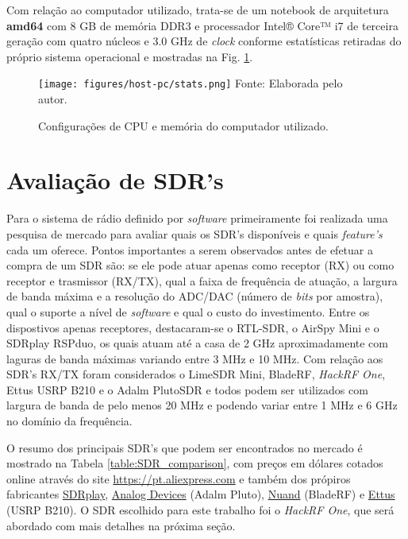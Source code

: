 \documentclass[
  12pt,				%
  openright,			%
  twoside,			%
  a4paper,			%
  english,			%
  french,				%
  spanish,			%
  brazil,				%
  ]{abntex2}
\begin{document}
Com relação ao computador utilizado, trata-se de um notebook de arquitetura \textbf{amd64} com 8 GB de memória DDR3 e processador Intel® Core™ i7 de terceira geração com quatro núcleos e
3.0 GHz de \textit{clock} conforme estatísticas retiradas do próprio sistema operacional e mostradas na Fig. \ref{fig:host_pc_stats}.

\begin{figure}[!htb]
  \centering
  \caption{Configurações de CPU e memória do computador utilizado.}
  \texttt{[image: figures/host-pc/stats.png]}
  Fonte: Elaborada pelo autor.
  \label{fig:host_pc_stats}
\end{figure}

\section*{Avaliação de SDR's}

Para o sistema de rádio definido por \textit{software} primeiramente foi realizada uma pesquisa de mercado para avaliar quais os SDR's disponíveis e quais
\textit{feature's} cada um oferece. Pontos importantes a serem observados antes de efetuar a compra de um SDR são: se ele pode atuar apenas como receptor
(RX) ou como receptor e trasmissor (RX/TX), qual a faixa de frequência de atuação, a largura de banda máxima e a resolução do ADC/DAC (número de \textit{bits} por amostra),
qual o suporte a nível de \textit{software} e qual o custo do investimento. Entre os dispostivos apenas receptores, destacaram-se o RTL-SDR, o AirSpy Mini e o SDRplay RSPduo,
os quais atuam até a casa de 2 GHz aproximadamente com laguras de banda máximas variando entre 3 MHz e 10 MHz. Com relação aos SDR's RX/TX foram considerados
o LimeSDR Mini, BladeRF, \textit{HackRF One}, Ettus USRP B210 e o Adalm PlutoSDR e todos podem ser utilizados com largura de banda de pelo menos 20 MHz e podendo variar
entre 1 MHz e 6 GHz no domínio da frequência.

O resumo dos principais SDR's que podem ser encontrados no mercado é mostrado na Tabela \ref{table:SDR_comparison}, com preços em dólares cotados online através do site \href{https://pt.aliexpress.com}{https://pt.aliexpress.com}
e também dos própiros fabricantes \href{https://www.sdrplay.com/rspduo/}{SDRplay}, \href{https://www.analog.com/en/design-center/evaluation-hardware-and-software/evaluation-boards-kits/adalm-pluto.html}{Analog Devices} (Adalm Pluto),
\href{https://www.nuand.com/bladerf-1/}{Nuand} (BladeRF) e \href{https://www.ettus.com/all-products/ub210-kit/}{Ettus} (USRP B210). O SDR escolhido para este trabalho foi o \textit{HackRF One}, que será abordado com mais detalhes na próxima seção.
\end{document}
